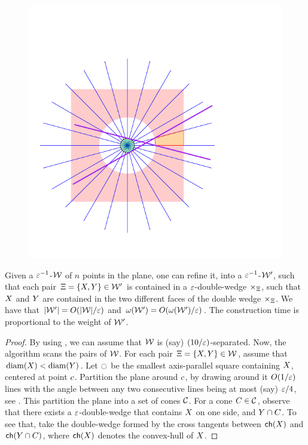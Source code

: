 \documentclass[12pt]{article}%
\begin{document}
\begin{figure}[ht]
    \centerline{\includegraphics{figs/partition}}
    \caption{}
\end{figure}


\begin{lemma}
    Given a $\varepsilon^{-1}$-\SSPD $\mathcal{W}$ of $n$ points in the plane, one
    can refine it, into a $\varepsilon^{-1}$-\SSPD $\mathcal{W}'$, such that each
    pair $\Xi = \{ X, Y \} \in \mathcal{W}'$ is contained in a
    $\varepsilon$-double-wedge $\times_\Xi$, such that $X$ and $Y$ are
    contained in the two different faces of the double wedge
    $\times_\Xi$. We have that $|\mathcal{W}'| = O(|\mathcal{W}|/\varepsilon)$ and
    $\WeightX{\WS'} = O(\WeightX{\WS'}/\eps)$. The construction time
    is proportional to the weight of $\mathcal{W}'$.
\end{lemma}
\begin{proof}
    By using , we can assume that $\mathcal{W}$ is (say)
    $(10/\varepsilon)$-separated.  Now, the algorithm scans the pairs of
    $\mathcal{W}$. For each pair $\Xi = \{ X, Y \} \in \mathcal{W}$, assume
    that $\diameterX{\PSX} < \diameterX{\PSY}$. Let $\ocircle$ be the
    smallest axis-parallel square containing $X$, centered at point
    $c$.  Partition the plane around $c$, by drawing around it
    $O(1/\varepsilon)$ lines with the angle between any two consecutive lines
    being at most (say) $\varepsilon/4$, see . This
    partition the plane into a set of cones $\mathcal{C}$. For a cone
    $C \in \mathcal{C}$, observe that there exists a $\varepsilon$-double-wedge
    that contains $X$ on one side, and $Y \cap C$. To see that,
    take the double-wedge formed by the cross tangents between
    $\CHX{\PSX}$ and $\CHX{\PSY \cap C}$, where $\CHX{\PSX}$ denotes
    the convex-hull of $X$.
\end{proof}
\end{document}
